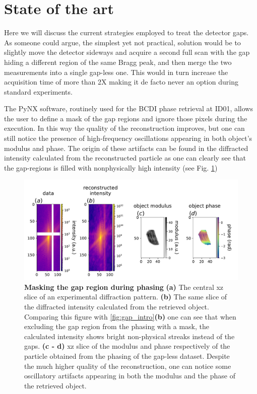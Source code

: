 \section{State of the art}\label{sec:InpStateArt}

Here we will discuss the current strategies employed to treat the detector gaps. As someone could argue, the simplest
yet not practical, solution would be to slightly move the detector sideways and acquire a second full scan with the
gap hiding a different region of the same Bragg peak, and then merge the two measurements into a single gap-less one. 
This would in turn increase the acquisition time of more than 2X making it de facto never an option during standard experiments. 

The PyNX software, routinely used for the BCDI phase retrieval at ID01, allows the user to define a mask of the gap 
regions and ignore those pixels during the execution. In this way the quality of the reconstruction improves, 
but one can still notice the presence of high-frequency oscillations appearing in both object's modulus and phase.
The origin of these artifacts can be found in the diffracted intensity calculated from the reconstructed particle as 
one can clearly see that the gap-regions is filled with nonphysically high intensity (see Fig. \ref{fig:gap_intro_mask})

\begin{figure}[h]
    \includegraphics[width=\textwidth]{figures/Inpainting/gaps_mask.pdf}
    \caption{\textbf{Masking the gap region during phasing} 
    \textbf{(a)} The central xz slice of an experimental diffraction pattern. \textbf{(b)} The same slice of the diffracted
    intensity calculated from the retrieved object. Comparing this figure with \ref{fig:gap_intro}\textbf{(b)} one can see that
    when excluding the gap region from the phasing with a mask, the calculated intensity shows bright non-physical streaks 
    instead of the gaps. \textbf{(c - d)} xz slice of the modulus and phase respectively of the particle obtained from the 
    phasing of the gap-less dataset. Despite the much higher quality of the reconstruction, one can notice some oscillatory
    artifacts appearing in both the modulus and the phase of the retrieved object. }
    \label{fig:gap_intro_mask}
    \end{figure}

